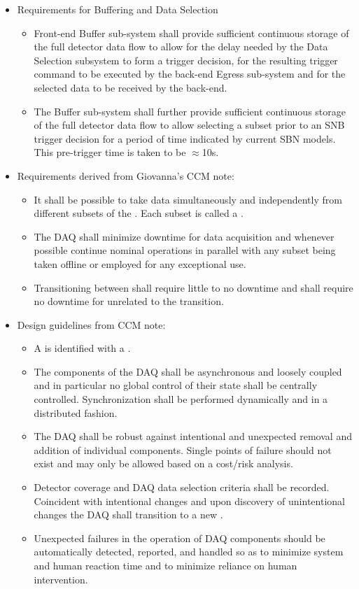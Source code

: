 \begin{itemize}
\item Requirements for Buffering and Data Selection
  \begin{itemize}
  \item Front-end Buffer sub-system shall provide sufficient continuous storage of the full detector data flow to allow for the delay needed by the Data Selection subsystem to form a trigger decision, for the resulting trigger command to be executed by the back-end Egress sub-system and for the selected data to be received by the back-end.
  \item The Buffer sub-system shall further provide sufficient continuous storage of the full detector data flow to allow selecting a subset prior to an SNB trigger decision for a period of time indicated by current SBN models. 
    This pre-trigger time is taken to be $\approx$10s.

  \end{itemize}

\item Requirements derived from Giovanna's CCM note:
  \begin{itemize}
  \item It shall be possible to take data simultaneously and independently from different subsets of the .  Each subset is called a .
  \item The DAQ shall minimize downtime for data acquisition and whenever possible continue nominal operations in parallel with any subset being taken offline or employed for any exceptional use.
  \item Transitioning between  shall require little to no downtime and shall require no downtime for  unrelated to the transition.  
  \end{itemize}

\item Design guidelines from CCM note:
  \begin{itemize}
  \item A  is identified with a .
  \item The components of the DAQ shall be asynchronous and loosely coupled and in particular no global control of their state shall be centrally controlled.  Synchronization shall be performed dynamically and in a distributed fashion. 
  \item The DAQ shall be robust against intentional and unexpected removal and addition of individual components. 
    Single points of failure should not exist and may only be allowed based on a cost/risk analysis.
  \item Detector coverage and DAQ data selection criteria shall be recorded.  Coincident with intentional changes and upon discovery of unintentional changes the DAQ shall transition to a new .
  \item Unexpected failures in the operation of DAQ components should be automatically detected, reported, and handled so as to minimize system and human reaction time and to minimize reliance on human intervention.
  \end{itemize}
\end{itemize}
